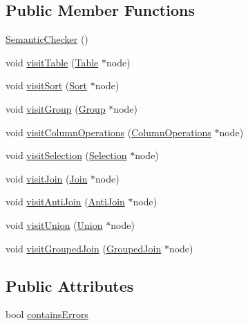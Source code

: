 \subsection*{Public Member Functions}
\begin{DoxyCompactItemize}
\item 
\hyperlink{classrafe_1_1_semantic_checker_a629ac4fa1f597fdbb8100734542851a1}{Semantic\+Checker} ()
\item 
void \hyperlink{classrafe_1_1_semantic_checker_a05c36f62e97b763b6b5ba3faeb79d0bf}{visit\+Table} (\hyperlink{classrafe_1_1_table}{Table} $\ast$node)
\item 
void \hyperlink{classrafe_1_1_semantic_checker_adf3ce7d0f3aa6ae9630d561edc1b0348}{visit\+Sort} (\hyperlink{classrafe_1_1_sort}{Sort} $\ast$node)
\item 
void \hyperlink{classrafe_1_1_semantic_checker_a89e58cb0414ac7f9657f3d16940e43db}{visit\+Group} (\hyperlink{classrafe_1_1_group}{Group} $\ast$node)
\item 
void \hyperlink{classrafe_1_1_semantic_checker_a367226c2e23e15030e30bebb614df22d}{visit\+Column\+Operations} (\hyperlink{classrafe_1_1_column_operations}{Column\+Operations} $\ast$node)
\item 
void \hyperlink{classrafe_1_1_semantic_checker_ad595114561381dbadaa6f75fd553764b}{visit\+Selection} (\hyperlink{classrafe_1_1_selection}{Selection} $\ast$node)
\item 
void \hyperlink{classrafe_1_1_semantic_checker_a5723cd81b7f2ba5f425e6fccf49741bc}{visit\+Join} (\hyperlink{classrafe_1_1_join}{Join} $\ast$node)
\item 
void \hyperlink{classrafe_1_1_semantic_checker_a891dd859fe5e91bc5c62cf8deaf5dddd}{visit\+Anti\+Join} (\hyperlink{classrafe_1_1_anti_join}{Anti\+Join} $\ast$node)
\item 
void \hyperlink{classrafe_1_1_semantic_checker_a86d3f5970f8f0994411aef2410986a0c}{visit\+Union} (\hyperlink{classrafe_1_1_union}{Union} $\ast$node)
\item 
void \hyperlink{classrafe_1_1_semantic_checker_a7cbba65715bdac55de4eef68a6698e17}{visit\+Grouped\+Join} (\hyperlink{classrafe_1_1_grouped_join}{Grouped\+Join} $\ast$node)
\end{DoxyCompactItemize}
\subsection*{Public Attributes}
\begin{DoxyCompactItemize}
\item 
bool \hyperlink{classrafe_1_1_semantic_checker_a2fd86b1075984031d5597e8b69820868}{contains\+Errors}
\end{DoxyCompactItemize}
